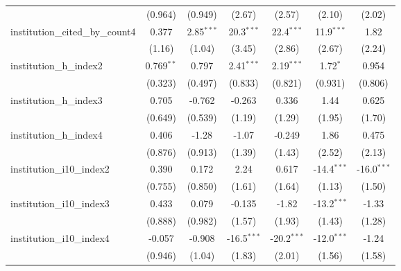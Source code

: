\begin{tabular}{lcccccc}
                                         & (0.964)       & (0.949)       & (2.67)        & (2.57)        & (2.10)        & (2.02)\\   
   institution\_cited\_by\_count4        & 0.377         & 2.85$^{***}$  & 20.3$^{***}$  & 22.4$^{***}$  & 11.9$^{***}$  & 1.82\\   
                                         & (1.16)        & (1.04)        & (3.45)        & (2.86)        & (2.67)        & (2.24)\\   
   institution\_h\_index2                & 0.769$^{**}$  & 0.797         & 2.41$^{***}$  & 2.19$^{***}$  & 1.72$^{*}$    & 0.954\\   
                                         & (0.323)       & (0.497)       & (0.833)       & (0.821)       & (0.931)       & (0.806)\\   
   institution\_h\_index3                & 0.705         & -0.762        & -0.263        & 0.336         & 1.44          & 0.625\\   
                                         & (0.649)       & (0.539)       & (1.19)        & (1.29)        & (1.95)        & (1.70)\\   
   institution\_h\_index4                & 0.406         & -1.28         & -1.07         & -0.249        & 1.86          & 0.475\\   
                                         & (0.876)       & (0.913)       & (1.39)        & (1.43)        & (2.52)        & (2.13)\\   
   institution\_i10\_index2              & 0.390         & 0.172         & 2.24          & 0.617         & -14.4$^{***}$ & -16.0$^{***}$\\   
                                         & (0.755)       & (0.850)       & (1.61)        & (1.64)        & (1.13)        & (1.50)\\   
   institution\_i10\_index3              & 0.433         & 0.079         & -0.135        & -1.82         & -13.2$^{***}$ & -1.33\\   
                                         & (0.888)       & (0.982)       & (1.57)        & (1.93)        & (1.43)        & (1.28)\\   
   institution\_i10\_index4              & -0.057        & -0.908        & -16.5$^{***}$ & -20.2$^{***}$ & -12.0$^{***}$ & -1.24\\   
                                         & (0.946)       & (1.04)        & (1.83)        & (2.01)        & (1.56)        & (1.58)\\   

\end{tabular}
